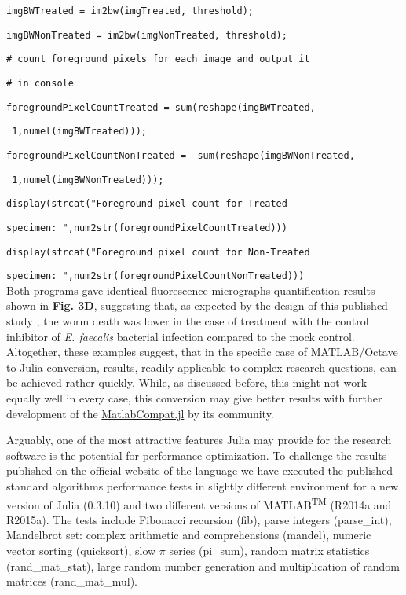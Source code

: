\verb|imgBWTreated = im2bw(imgTreated, threshold);|

\verb|imgBWNonTreated = im2bw(imgNonTreated, threshold);|

\verb|# count foreground pixels for each image and output it|

\verb|# in console|

\verb|foregroundPixelCountTreated = sum(reshape(imgBWTreated,|

\verb| 1,numel(imgBWTreated)));|

\verb|foregroundPixelCountNonTreated =  sum(reshape(imgBWNonTreated,|

\verb| 1,numel(imgBWNonTreated)));|

\verb|display(strcat("Foreground pixel count for Treated|

\verb|specimen: ",num2str(foregroundPixelCountTreated)))|

\verb|display(strcat("Foreground pixel count for Non-Treated|

\verb|specimen: ",num2str(foregroundPixelCountNonTreated)))|\\


Both programs gave identical fluorescence micrographs quantification results shown in \textbf{Fig. 3D}, suggesting that, as expected by the design of this published study \cite{Moy_2009}, the worm death was lower in the case of treatment with the control inhibitor of \textit{E. faecalis} bacterial infection compared to the mock control. Altogether, these examples suggest, that in the specific case of MATLAB/Octave to Julia conversion, results, readily applicable to complex research questions, can be achieved rather quickly. While, as discussed before, this might not work equally well in every case, this conversion may give better results with further development of the \href{https://github.com/MatlabCompat/MatlabCompat.jl}{MatlabCompat.jl} by its community.


Arguably, one of the most attractive features Julia may provide for the research software is the potential for performance optimization. To challenge the results \href{http://julialang.org/benchmarks/}{published} on the official website of the language we have executed the published standard algorithms performance tests in slightly different environment for a new version of Julia (0.3.10) and two different versions of MATLAB\textsuperscript{TM} (R2014a and R2015a). The tests include Fibonacci recursion (fib), parse integers (parse\_int), Mandelbrot set: complex arithmetic and comprehensions (mandel), numeric vector sorting (quicksort), slow $\pi$ series (pi\_sum), random matrix statistics (rand\_mat\_stat), large random number generation and multiplication of random matrices (rand\_mat\_mul).

